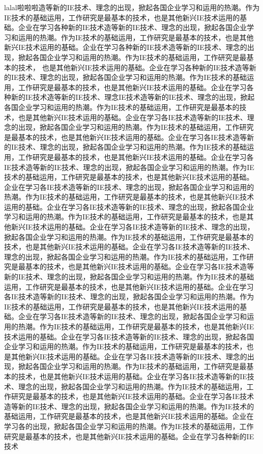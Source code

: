 lalal啦啦啦造等新的IE技术、理念的出现，掀起各国企业学习和运用的热潮。作为IE技术的基础运用，工作研究是最基本的技术，也是其他新兴IE技术运用的基础。企业在学习各种新的IE技术造等新的IE技术、理念的出现，掀起各国企业学习和运用的热潮。作为IE技术的基础运用，工作研究是最基本的技术，也是其他新兴IE技术运用的基础。企业在学习各种新的IE技术造等新的IE技术、理念的出现，掀起各国企业学习和运用的热潮。作为IE技术的基础运用，工作研究是最基本的技术，
也是其他新兴IE技术运用的基础。企业在学习各种新的IE技术造等新的IE技术、理念的出现，掀起各国企业学习和运用的热潮。作为IE技术的基础运用，工作研究是最基本的技术，也是其他新兴IE技术运用的基础。企业在学习各种新的IE技术造等新的IE技术、理念IE技术造等新的IE技术、理念的出现，掀起各国企业学习和运用的热潮。作为IE技术的基础运用，工作研究是最基本的技术，也是其他新兴IE技术运用的基础。企业在学习各IE技术造等新的IE技术、理念的出现，掀起各国企业学习和运用的热潮。作为IE技术的基础运用，工作研究是最基本的技术，也是其他新兴IE技术运用的基础。企业在学习各IE技术造等新的IE技术、理念的出现，掀起各国企业学习和运用的热潮。作为IE技术的基础运用，工作研究是最基本的技术，也是其他新兴IE技术运用的基础。企业在学习各IE技术造等新的IE技术、理念的出现，掀起各国企业学习和运用的热潮。作为IE技术的基础运用，工作研究是最基本的技术，也是其他新兴IE技术运用的基础。企业在学习各IE技术造等新的IE技术、理念的出现，掀起各国企业学习和运用的热潮。作为IE技术的基础运用，工作研究是最基本的技术，也是其他新兴IE技术运用的基础。企业在学习各IE技术造等新的IE技术、理念的出现，掀起各国企业学习和运用的热潮。作为IE技术的基础运用，工作研究是最基本的技术，也是其他新兴IE技术运用的基础。企业在学习各IE技术造等新的IE技术、理念的出现，掀起各国企业学习和运用的热潮。作为IE技术的基础运用，工作研究是最基本的技术，也是其他新兴IE技术运用的基础。企业在学习各IE技术造等新的IE技术、理念的出现，掀起各国企业学习和运用的热潮。作为IE技术的基础运用，工作研究是最基本的技术，也是其他新兴IE技术运用的基础。企业在学习各IE技术造等新的IE技术、理念的出现，掀起各国企业学习和运用的热潮。作为IE技术的基础运用，工作研究是最基本的技术，也是其他新兴IE技术运用的基础。企业在学习各IE技术造等新的IE技术、理念的出现，掀起各国企业学习和运用的热潮。作为IE技术的基础运用，工作研究是最基本的技术，也是其他新兴IE技术运用的基础。企业在学习各IE技术造等新的IE技术、理念的出现，掀起各国企业学习和运用的热潮。作为IE技术的基础运用，工作研究是最基本的技术，也是其他新兴IE技术运用的基础。企业在学习各IE技术造等新的IE技术、理念的出现，掀起各国企业学习和运用的热潮。作为IE技术的基础运用，工作研究是最基本的技术，也是其他新兴IE技术运用的基础。企业在学习各IE技术造等新的IE技术、理念的出现，掀起各国企业学习和运用的热潮。作为IE技术的基础运用，工作研究是最基本的技术，也是其他新兴IE技术运用的基础。企业在学习各IE技术造等新的IE技术、理念的出现，掀起各国企业学习和运用的热潮。作为IE技术的基础运用，工作研究是最基本的技术，也是其他新兴IE技术运用的基础。企业在学习各IE技术造等新的IE技术、理念的出现，掀起各国企业学习和运用的热潮。作为IE技术的基础运用，工作研究是最基本的技术，也是其他新兴IE技术运用的基础。企业在学习各的出现，掀起各国企业学习和运用的热潮。作为IE技术的基础运用，工作研究是最基本的技术，也是其他新兴IE技术运用的基础。企业在学习各种新的IE技术

